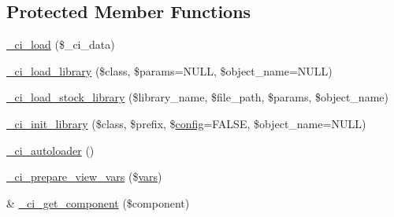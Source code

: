 \subsection*{Protected Member Functions}
\begin{DoxyCompactItemize}
\item 
\mbox{\hyperlink{class_c_i___loader_aa87f8d7f9cf1d3dd4e5201d2a2df20ef}{\+\_\+ci\+\_\+load}} (\$\+\_\+ci\+\_\+data)
\item 
\mbox{\hyperlink{class_c_i___loader_a2982eba200c547294aefe2f63f0b9890}{\+\_\+ci\+\_\+load\+\_\+library}} (\$class, \$params=N\+U\+LL, \$object\+\_\+name=N\+U\+LL)
\item 
\mbox{\hyperlink{class_c_i___loader_a9c95d03c399fcee01973e176ac98e285}{\+\_\+ci\+\_\+load\+\_\+stock\+\_\+library}} (\$library\+\_\+name, \$file\+\_\+path, \$params, \$object\+\_\+name)
\item 
\mbox{\hyperlink{class_c_i___loader_af4df75f7462fb73ba602a45f466a690d}{\+\_\+ci\+\_\+init\+\_\+library}} (\$class, \$prefix, \$\mbox{\hyperlink{class_c_i___loader_ab9f1da83fcb2e2177ab64bbf3587da0b}{config}}=F\+A\+L\+SE, \$object\+\_\+name=N\+U\+LL)
\item 
\mbox{\hyperlink{class_c_i___loader_affd5b69b8d0f2883d89255967eba7129}{\+\_\+ci\+\_\+autoloader}} ()
\item 
\mbox{\hyperlink{class_c_i___loader_a62ca3e2ed3ac45c9fb807f369e0c458c}{\+\_\+ci\+\_\+prepare\+\_\+view\+\_\+vars}} (\$\mbox{\hyperlink{class_c_i___loader_a25d97e2518910ee0790d3dbbac1c013f}{vars}})
\item 
\& \mbox{\hyperlink{class_c_i___loader_a492c1af2096e19bb4d1d5af28130a729}{\+\_\+ci\+\_\+get\+\_\+component}} (\$component)
\end{DoxyCompactItemize}
